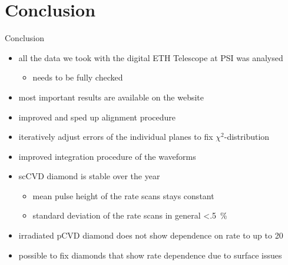 \section{Conclusion}
\begin{frame}{Conclusion}

	\begin{minipage}[c][6cm]{\textwidth}
		\begin{itemize}\itemfill
			\item all the data we took with the digital ETH Telescope at PSI was analysed
			\begin{itemize}
				\item needs to be fully checked
			\end{itemize}
			\item most important results are available on the website
			\item improved and sped up alignment procedure
			\item iteratively adjust errors of the individual planes to fix $\chi^2$-distribution
			\item improved integration procedure of the waveforms
			\item scCVD diamond is stable over the year 
			\begin{itemize}
				\item mean pulse height of the rate scans stays constant
				\item standard deviation of the rate scans in general \SI{<.5}{\%}
			\end{itemize}
			\item irradiated pCVD diamond does not show dependence on rate to  up to \SI{20}{\mhzcm}
			\item possible to fix diamonds that show rate dependence due to surface issues
		\end{itemize}
	\end{minipage}
	
\end{frame}
